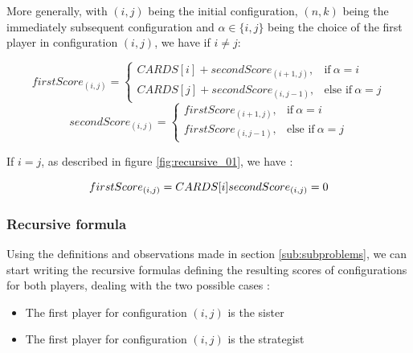 \documentclass[a4paper,12pt,fleqn]{article}
\newcommand\ezskip{\medskip\noindent}
\begin{document}
\ezskip
More generally, with $(i,j)$ being the initial configuration, $(n,k)$ being the immediately subsequent configuration and $\alpha \in \{i,j\}$ being the choice of the first player in configuration $(i,j)$, we have if $i \neq j$:

    \begin{equation}
    firstScore_{(i,j)} =    \begin{cases}
                                CARDS[i] + secondScore_{(i+1,j)}, & \text{if}\ \alpha=i \\
                                CARDS[j] + secondScore_{(i,j-1)}, & \text{else if}\ \alpha=j
                            \end{cases}
    \end{equation}
    \begin{equation} \label{eq:secondScore}
    secondScore_{(i,j)} =    \begin{cases}
                                firstScore_{(i+1,j)}, & \text{if}\ \alpha=i \\
                                firstScore_{(i,j-1)}, & \text{else if}\ \alpha=j
                            \end{cases}
    \end{equation}
    
If $i = j$, as described in figure \ref{fig:recursive_01}, we have :

    \begin{equation}
    firstScore_{(i,j)} = CARDS[i]
    \\
    secondScore_{(i,j)} = 0
    \end{equation}

\subsubsection{Recursive formula} \label{susub:recursive_formula}

Using the definitions and observations made in section \ref{sub:subproblems}, we can start writing the recursive formulas defining the resulting scores of configurations for both players, dealing with the two possible cases :

\begin{itemize}
    \item The first player for configuration $(i,j)$ is the sister
    \item The first player for configuration $(i,j)$ is the strategist
\end{itemize}
\end{document}
